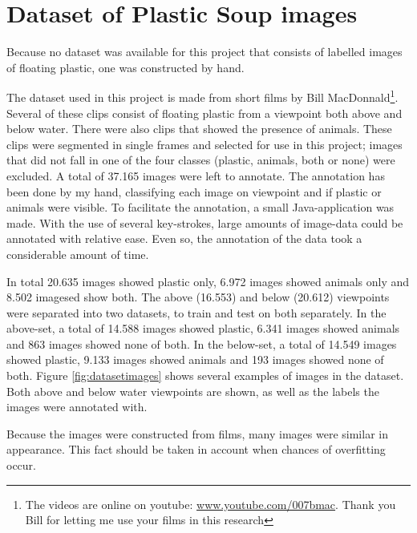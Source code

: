 \section{Dataset of Plastic Soup images}
\label{sec:Data}
Because no dataset was available for this project that consists of labelled images of floating plastic, one was constructed by hand.

The dataset used in this project is made from short films by Bill MacDonnald\footnote{The videos are online on youtube: \url{www.youtube.com/007bmac}. Thank you Bill for letting me use your films in this research}.
Several of these clips consist of floating plastic from a viewpoint both above and below water.
There were also clips that showed the presence of animals.
These clips were segmented in single frames and selected for use in this project; images that did not fall in one of the four classes (plastic, animals, both or none) were excluded.
A total of 37.165 images were left to annotate.
The annotation has been done by my hand, classifying each image on viewpoint and if plastic or animals were visible.
To facilitate the annotation, a small Java-application was made.
With the use of several key-strokes, large amounts of image-data could be annotated with relative ease.
Even so, the annotation of the data took a considerable amount of time.

In total 20.635 images showed plastic only, 6.972 images showed animals only and 8.502 imagesed show both.
The above (16.553) and below (20.612) viewpoints were separated into two datasets, to train and test on both separately. 
In the above-set, a total of 14.588 images showed plastic, 6.341 images showed animals and 863 images showed none of both. In the below-set, a total of 14.549 images showed plastic, 9.133 images showed animals and 193 images showed none of both.
Figure \ref{fig:datasetimages} shows several examples of images in the dataset.
Both above and below water viewpoints are shown, as well as the labels the images were annotated with.

Because the images were constructed from films, many images were similar in appearance.
This fact should be taken in account when chances of overfitting occur.

